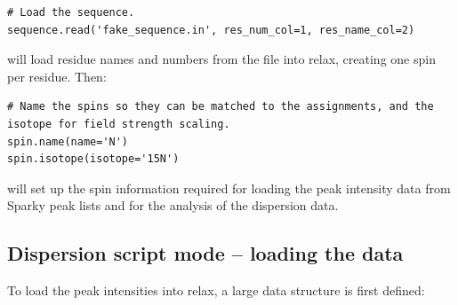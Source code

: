\begin{lstlisting}[firstnumber=45]
# Load the sequence.
sequence.read('fake_sequence.in', res_num_col=1, res_name_col=2)
\end{lstlisting}

will load residue names and numbers from the  file into relax, creating one spin per residue.  Then:

\begin{lstlisting}[firstnumber=48]
# Name the spins so they can be matched to the assignments, and the isotope for field strength scaling.
spin.name(name='N')
spin.isotope(isotope='15N')
\end{lstlisting}

will set up the spin information required for loading the peak intensity data from Sparky peak lists and for the analysis of the dispersion data.



\subsection{Dispersion script mode -- loading the data}

To load the peak intensities into relax, a large data structure is first defined:

